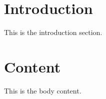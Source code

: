 \section{Introduction}
This is the introduction section.

\section{Content}
This is the body content.